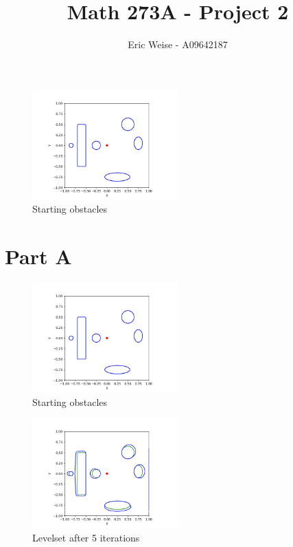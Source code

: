 \documentclass{article}
\title{Math 273A - Project 2}
\author{Eric Weise - A09642187}
\begin{document}
\maketitle

\begin{figure}[H]
    \caption{Starting obstacles}
    \centering
        \includegraphics[width=0.5\textwidth]{part_a-levelset-0000.png}
\end{figure}


\section*{Part A}
\begin{figure}[H]
    \caption{Starting obstacles}
    \centering
        \includegraphics[width=0.5\textwidth]{part_a-levelset-0000.png}
\end{figure}

\begin{figure}[H]
    \caption{Levelset after 5 iterations}
    \centering
        \includegraphics[width=0.5\textwidth]{part_a-levelset-0005.png}
\end{figure}
\end{document}
